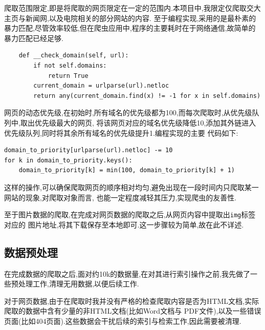 \documentclass[a4paper]{article}
\begin{document}
爬取范围限定,即是将爬取的网页限定在一定的范围内.本项目中,我限定仅爬取交大主页与新闻网,以及电院相关的部分网站的内容.
至于编程实现,采用的是最朴素的暴力匹配,尽管效率较低,但在爬虫应用中,程序的主要耗时在于网络通信,故简单的暴力匹配已经足够.
\begin{verbatim}
    def __check_domain(self, url):
        if not self.domains:
            return True
        current_domain = urlparse(url).netloc
        return any(current_domain.find(x) != -1 for x in self.domains)
\end{verbatim}

网页的动态优先级,在初始时,所有域名的优先级都为100,而每次爬取时,从优先级队列中,取出优先级最大的网页,
将该网页对应的域名优先级降低10,添加其外链进入优先级队列,同时将其余所有域名的优先级提升1.编程实现的主要
代码如下:

\begin{verbatim}
domain_to_priority[urlparse(url).netloc] -= 10
for k in domain_to_priority.keys():
    domain_to_priority[k] = min(100, domain_to_priority[k] + 1)
\end{verbatim}

这样的操作,可以确保爬取网页的顺序相对均匀,避免出现在一段时间内只爬取某一网站的现象,对爬取对象而言,
也能一定程度减轻其压力,实现爬虫的友善性.

至于图片数据的爬取,在完成对网页数据的爬取之后,从网页内容中提取出\texttt{img}标签对应的
图片地址,将其下载保存至本地即可.这一步骤较为简单,故在此不详述.

        \subsection{数据预处理}
在完成数据的爬取之后,面对约10k的数据量,在对其进行索引操作之前,我先做了一些预处理工作,清理无用数据,以便后续工作.

对于网页数据,由于在爬取时我并没有严格的检查爬取内容是否为HTML文档,实际爬取的数据中含有少量的非HTML文档(比如Word文档与
PDF文件),以及一些错误页面(比如404页面).这些数据会干扰后续的索引与检索工作,因此需要被清理.
\end{document}
